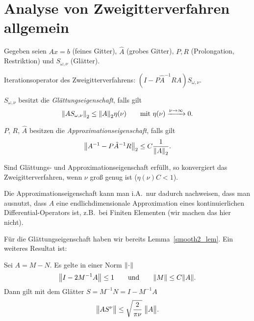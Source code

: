 \section[Analyse allgemein]{Analyse von Zweigitterverfahren allgemein}

Gegeben seien $Ax=b$ (\glqq{}feines Gitter\grqq{}), $\hat A$ (grobes
Gitter), $P,R$ (Prolongation, Restriktion) und $S_{\omega,\nu}$
(Gl\"atter).

Iterationsoperator des Zweigitterverfahrens:
$(I-P\hat A^{-1}RA)S_{\omega,\nu}$.

\begin{defn}
  $S_{\omega,\nu}$ besitzt die \emph{Gl\"attungseigenschaft}, falls gilt
  \begin{equation*}
    \norm{AS_{\omega,\nu}}_2
    \leq
    \norm{A}_2\eta(\nu)
    \qquad
    \text{mit }
    \eta(\nu)\xrightarrow{\nu\to\infty}0.
  \end{equation*}
\end{defn}

\begin{defn}
  $P$, $R$, $\hat{A}$ besitzen die \emph{Approximationseigenschaft},
  falls gilt
  \begin{equation*}
    \norm[big]{A^{-1}-P\hat A^{-1}R}_2
    \leq
    C\frac{1}{\norm{A}_2}.
  \end{equation*}
\end{defn}

\begin{sa}
  Sind Gl\"attungs- und Approximationseigenschaft erf\"ullt, so
  konvergiert das Zweigitterverfahren, wenn $\nu$ gro\ss{} genug ist
  ($\eta(\nu)C<1$).
\end{sa}

\begin{bem}
  Die Approximationseigenschaft kann man i.A.\ nur dadurch nachweisen,
  dass man ausnutzt, dass $A$ eine endlichdimensionale Approximation
  eines kontinuierlichen Differential-Operators ist, z.B.\ bei Finiten
  Elementen (wir machen das hier nicht).
\end{bem}

F\"ur die Gl\"attungseigenschaft haben wir bereits Lemma~\ref{smooth2_lem}.
Ein weiteres Resultat ist:

\begin{lem}
  Sei $A=M-N$. Es gelte in einer Norm $\norm{}$
  \begin{equation*}
    \norm{I-2M^{-1}A} \leq 1
    \qquad\text{und}\qquad
    \norm{M} \leq C\norm{A}
    .
  \end{equation*}
  Dann gilt mit dem Gl\"atter $S=M^{-1}N=I-M^{-1}A$
  \begin{equation*}
    \norm[big]{AS^\nu}
    \leq
    \sqrt{\frac{2}{\pi\nu}}\;\norm[big]{A}.
  \end{equation*}
\end{lem}

